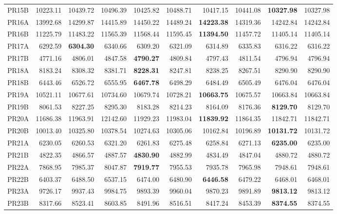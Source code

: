 \documentclass{setp-new}
\begin{document}
\begin{table}[H]
{\begin{tabular}{lrrrrrrrrr}
    PR15B & 10223.11 & 10439.72 & 10496.39 & 10425.82 & 10488.71 & 10417.15 & 10441.08 & \textbf{10327.98} & 10327.98\\
    PR16A & 13992.68 & 14299.87 & 14415.89 & 14450.22 & 14489.24 & \textbf{14223.38} & 14319.36 & 14242.84 & 14242.84\\
    PR16B & 11225.79 & 11483.22 & 11565.39 & 11568.44 & 11595.45 & \textbf{11394.50} & 11457.72 & 11405.14 & 11405.14\\
    PR17A & 6292.59 & \textbf{6304.30} & 6340.66 & 6309.20 & 6321.09 & 6314.89 & 6335.83 & 6316.22 & 6316.22\\
    PR17B & 4771.16 & 4806.01 & 4847.58 & \textbf{4790.27} & 4809.84 & 4797.43 & 4811.54 & 4796.94 & 4796.94\\
    PR18A & 8183.24 & 8308.32 & 8381.71 & \textbf{8228.31} & 8247.81 & 8238.25 & 8267.51 & 8290.90 & 8290.90\\
    PR18B & 6443.46 & 6526.72 & 6555.95 & \textbf{6467.78} & 6498.29 & 6484.49 & 6505.49 & 6476.04 & 6476.04\\
    PR19A & 10521.11 & 10677.61 & 10734.60 & 10679.74 & 10728.21 & \textbf{10663.75} & 10675.57 & 10663.84 & 10663.84\\
    PR19B & 8061.53 & 8227.25 & 8295.30 & 8183.28 & 8214.23 & 8164.09 & 8176.36 & \textbf{8129.70} & 8129.70\\
    PR20A & 11686.38 & 11963.91 & 12142.60 & 11929.23 & 11983.04 & \textbf{11839.92} & 11864.35 & 11842.71 & 11842.71\\
    PR20B & 10013.40 & 10325.80 & 10378.54 & 10274.63 & 10305.06 & 10162.84 & 10196.89 & \textbf{10131.72} & 10131.72\\
    PR21A & 6230.05 & 6260.53 & 6321.20 & 6261.83 & 6275.48 & 6258.84 & 6271.13 & \textbf{6235.00} & 6235.00\\
    PR21B & 4822.35 & 4866.57 & 4887.57 & \textbf{4830.90} & 4882.99 & 4834.49 & 4847.04 & 4880.72 & 4880.72\\
    PR22A & 7868.95 & 7985.37 & 8047.87 & \textbf{7919.77} & 7955.53 & 7935.78 & 7965.98 & 7948.61 & 7948.61\\
    PR22B & 6403.37 & 6488.50 & 6537.15 & 6474.00 & 6480.90 & \textbf{6446.58} & 6479.22 & 6468.01 & 6468.01\\
    PR23A & 9726.17 & 9937.43 & 9984.75 & 9893.39 & 9960.04 & 9870.23 & 9891.89 & \textbf{9813.12} & 9813.12\\
    PR23B & 8317.66 & 8523.41 & 8603.85 & 8491.96 & 8516.51 & 8417.24 & 8453.39 & \textbf{8374.55} & 8374.55\\

\end{tabular}}
\end{table}
\end{document}
